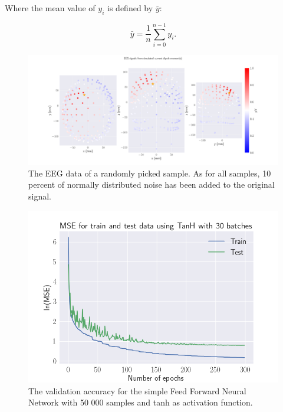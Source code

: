 \documentclass[a4paper, UKenglish, 11pt]{uiomaster}
\begin{document}
Where the mean value of $y_i$ is defined by $\bar{y}$:

\begin{equation*}
\bar{y} =  \frac{1}{n} \sum_{i=0}^{n - 1} y_i.
\label{eq:ybar}
\end{equation*}

\begin{figure}[!htb]
    \centering
    \includegraphics[width=\linewidth]{../Finals/plots/simple_dipole_eeg_field_noise_1000.png}
    \caption{The EEG data of a randomly picked sample. As for all samples, 10 percent of normally distributed noise has been added to the original signal.}
    \label{fig:eeg_field_10percent_noise}
\end{figure}

\begin{figure}[!htb]
    \centering
    \includegraphics[width=\linewidth]{../Finals/plots/MSE_simple_dipole_lr0.001_l1_penalty_300_50000_TanH_30_300_N_dipoles_1.png}
    \caption{The validation accuracy for the simple Feed Forward Neural Network with 50 000 samples and tanh as activation function. }
    \label{fig:single_dipole_accuracy}
\end{figure}
\end{document}
